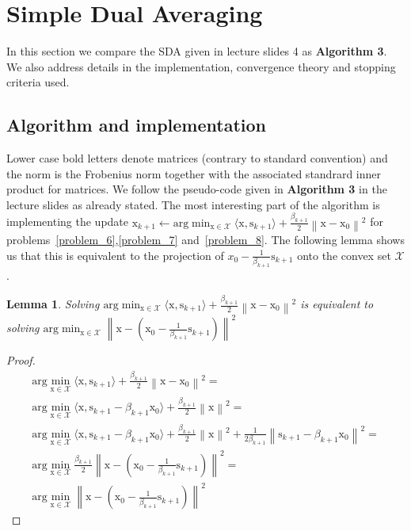 \documentclass{article}
\newcommand{\0}{\mathrm{0}}
\newcommand{\1}{\mathrm{1}}
\newcommand{\s}{\mathrm{s}}
\newcommand{\x}{\mathrm{x}}
\newcommand{\norm}[1]{\left\| #1 \right\|}
\newtheorem{lemma}[theorem]{Lemma}
\begin{document}
\section{Simple Dual Averaging}
In this section we compare the SDA given in lecture slides 4 as \textbf{Algorithm 3}. We also address details in the implementation, convergence theory and stopping criteria used.
\subsection{Algorithm and implementation}
Lower case bold letters denote matrices (contrary to standard convention) and the norm is the Frobenius norm together with the associated standrard inner product for matrices. We follow the pseudo-code given in \textbf{Algorithm 3} in the lecture slides as already stated. The most interesting part of the algorithm is implementing the update $\x_{k+1} \leftarrow \text{arg}\min_{\x\in\mathcal{X}} \langle \x,\s_{k+1}\rangle + \frac{\beta_{k+1}}{2}\norm{\x - \x_0}^2$ for problems~\ref{problem_6},\ref{problem_7} and~\ref{problem_8}. The following lemma shows us that this is equivalent to the projection of $x_0 - \frac{1}{\beta_{k+1}}\s_{k+1}$ onto the convex set $\mathcal{X}$.
\begin{lemma}
  Solving $\text{arg}\min_{\x\in\mathcal{X}} \langle \x,\s_{k+1}\rangle + \frac{\beta_{k+1}}{2}\norm{\x - \x_0}^2$ is equivalent to solving $\text{arg}\min_{\x\in\mathcal{X}}\norm{\x - (\x_0 - \frac{1}{\beta_{k+1}}\s_{k+1})}^2$
\end{lemma}
\begin{proof}
  \begin{equation}
    \begin{aligned}
      \text{arg}\min_{\x\in\mathcal{X}} \langle \x,\s_{k+1}\rangle + \frac{\beta_{k+1}}{2}\norm{\x - \x_0}^2 =\\
      \text{arg}\min_{\x\in\mathcal{X}} \langle \x,\s_{k+1} - \beta_{k+1}\x_0\rangle + \frac{\beta_{k+1}}{2}\norm{\x}^2 =\\
      \text{arg}\min_{\x\in\mathcal{X}} \langle \x,\s_{k+1}- \beta_{k+1}\x_0\rangle + \frac{\beta_{k+1}}{2}\norm{\x }^2 + \frac{1}{2\beta_{k+1}}\norm{\s_{k+1} - \beta_{k+1}\x_0}^2 =\\
      \text{arg}\min_{\x\in\mathcal{X}}\frac{\beta_{k+1}}{2}\norm{\x - (\x_0 - \frac{1}{\beta_{k+1}}\s_{k+1})}^2 =\\
      \text{arg}\min_{\x\in\mathcal{X}}\norm{\x - (\x_0 - \frac{1}{\beta_{k+1}}\s_{k+1})}^2
    \end{aligned}
  \end{equation}
\end{proof}
\end{document}

